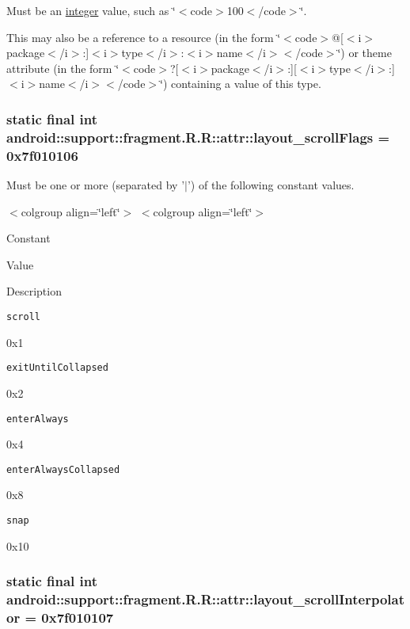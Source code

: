 Must be an \hyperlink{classandroid_1_1support_1_1fragment_1_1_r_1_1integer}{integer} value, such as \char`\"{}$<$code$>$100$<$/code$>$\char`\"{}. 

This may also be a reference to a resource (in the form \char`\"{}$<$code$>$@\mbox{[}$<$i$>$package$<$/i$>$:\mbox{]}$<$i$>$type$<$/i$>$:$<$i$>$name$<$/i$>$$<$/code$>$\char`\"{}) or theme attribute (in the form \char`\"{}$<$code$>$?\mbox{[}$<$i$>$package$<$/i$>$:\mbox{]}\mbox{[}$<$i$>$type$<$/i$>$:\mbox{]}$<$i$>$name$<$/i$>$$<$/code$>$\char`\"{}) containing a value of this type. \hypertarget{classandroid_1_1support_1_1fragment_1_1_r_1_1attr_f7c2bfded174abadc648266344de5cfc}{
\subsubsection[{layout\_\-scrollFlags}]{\setlength{\rightskip}{0pt plus 5cm}static final int android::support::fragment.R.R::attr::layout\_\-scrollFlags = 0x7f010106}}
\label{classandroid_1_1support_1_1fragment_1_1_r_1_1attr_f7c2bfded174abadc648266344de5cfc}


Must be one or more (separated by '$|$') of the following constant values. \begin{TabularC}{0}
\hline
\end{TabularC}
$<$colgroup align=\char`\"{}left\char`\"{}$>$ $<$colgroup align=\char`\"{}left\char`\"{}$>$ 

Constant

Value

Description 

{\tt scroll}

0x1

{\tt exitUntilCollapsed}

0x2

{\tt enterAlways}

0x4

{\tt enterAlwaysCollapsed}

0x8

{\tt snap}

0x10\hypertarget{classandroid_1_1support_1_1fragment_1_1_r_1_1attr_b4dd9895a15352f95e0520e5b545f80a}{
\subsubsection[{layout\_\-scrollInterpolator}]{\setlength{\rightskip}{0pt plus 5cm}static final int android::support::fragment.R.R::attr::layout\_\-scrollInterpolator = 0x7f010107}}
\label{classandroid_1_1support_1_1fragment_1_1_r_1_1attr_b4dd9895a15352f95e0520e5b545f80a}


